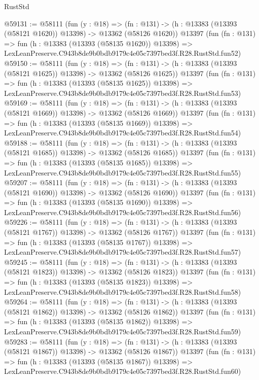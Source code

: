 \begin{lexlean}{RustStd}
\begin{coremodule}
@59131 := @58111
    (fun (y : @18) =>
    (fn : @131) -> (h : @13383 (@13393 (@58121 @1620)) @13398) -> @13362 (@58126 @1620))
    @13397
    (fun (fn : @131) =>
    fun (h : @13383 (@13393 (@58135 @1620)) @13398) =>
    LexLeanPreserve.C943b8de9b0bdb9179c4e05c7397bed3f.R28.RustStd.fun52)
@59150 := @58111
    (fun (y : @18) =>
    (fn : @131) -> (h : @13383 (@13393 (@58121 @1625)) @13398) -> @13362 (@58126 @1625))
    @13397
    (fun (fn : @131) =>
    fun (h : @13383 (@13393 (@58135 @1625)) @13398) =>
    LexLeanPreserve.C943b8de9b0bdb9179c4e05c7397bed3f.R28.RustStd.fun53)
@59169 := @58111
    (fun (y : @18) =>
    (fn : @131) -> (h : @13383 (@13393 (@58121 @1669)) @13398) -> @13362 (@58126 @1669))
    @13397
    (fun (fn : @131) =>
    fun (h : @13383 (@13393 (@58135 @1669)) @13398) =>
    LexLeanPreserve.C943b8de9b0bdb9179c4e05c7397bed3f.R28.RustStd.fun54)
@59188 := @58111
    (fun (y : @18) =>
    (fn : @131) -> (h : @13383 (@13393 (@58121 @1685)) @13398) -> @13362 (@58126 @1685))
    @13397
    (fun (fn : @131) =>
    fun (h : @13383 (@13393 (@58135 @1685)) @13398) =>
    LexLeanPreserve.C943b8de9b0bdb9179c4e05c7397bed3f.R28.RustStd.fun55)
@59207 := @58111
    (fun (y : @18) =>
    (fn : @131) -> (h : @13383 (@13393 (@58121 @1690)) @13398) -> @13362 (@58126 @1690))
    @13397
    (fun (fn : @131) =>
    fun (h : @13383 (@13393 (@58135 @1690)) @13398) =>
    LexLeanPreserve.C943b8de9b0bdb9179c4e05c7397bed3f.R28.RustStd.fun56)
@59226 := @58111
    (fun (y : @18) =>
    (fn : @131) -> (h : @13383 (@13393 (@58121 @1767)) @13398) -> @13362 (@58126 @1767))
    @13397
    (fun (fn : @131) =>
    fun (h : @13383 (@13393 (@58135 @1767)) @13398) =>
    LexLeanPreserve.C943b8de9b0bdb9179c4e05c7397bed3f.R28.RustStd.fun57)
@59245 := @58111
    (fun (y : @18) =>
    (fn : @131) -> (h : @13383 (@13393 (@58121 @1823)) @13398) -> @13362 (@58126 @1823))
    @13397
    (fun (fn : @131) =>
    fun (h : @13383 (@13393 (@58135 @1823)) @13398) =>
    LexLeanPreserve.C943b8de9b0bdb9179c4e05c7397bed3f.R28.RustStd.fun58)
@59264 := @58111
    (fun (y : @18) =>
    (fn : @131) -> (h : @13383 (@13393 (@58121 @1862)) @13398) -> @13362 (@58126 @1862))
    @13397
    (fun (fn : @131) =>
    fun (h : @13383 (@13393 (@58135 @1862)) @13398) =>
    LexLeanPreserve.C943b8de9b0bdb9179c4e05c7397bed3f.R28.RustStd.fun59)
@59283 := @58111
    (fun (y : @18) =>
    (fn : @131) -> (h : @13383 (@13393 (@58121 @1867)) @13398) -> @13362 (@58126 @1867))
    @13397
    (fun (fn : @131) =>
    fun (h : @13383 (@13393 (@58135 @1867)) @13398) =>
    LexLeanPreserve.C943b8de9b0bdb9179c4e05c7397bed3f.R28.RustStd.fun60)

\end{coremodule}
\end{lexlean}
